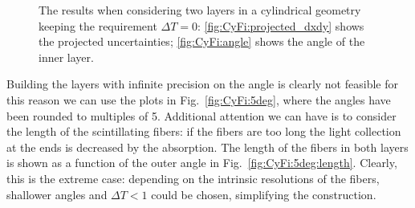 \begin{refsection}
\begin{figure}[ht]
        \centering
        \hfill
        \caption{The results when considering two layers in a cylindrical geometry keeping the requirement $\Delta T=0$: \ref{fig:CyFi:projected_dxdy} shows the projected uncertainties; \ref{fig:CyFi:angle} shows the angle of the inner layer.}
        \label{fig:CyFi}
    \end{figure}
    Building the layers with infinite precision on the angle is clearly not feasible for this reason we can use the plots in Fig.~\ref{fig:CyFi:5deg}, where the angles have been rounded to multiples of \SI{5}{\deg}. 
    Additional attention we can have is to consider the length of the scintillating fibers: if the fibers are too long the light collection at the ends is decreased by the absorption. The length of the fibers in both layers is shown as a function of the outer angle in Fig.~\ref{fig:CyFi:5deg:length}.
    Clearly, this is the extreme case: depending on the intrinsic resolutions of the fibers, shallower angles and $\Delta T<1$ could be chosen, simplifying the construction. 
    \begin{figure}[ht]   
        \centering

\end{figure}
\end{refsection}

